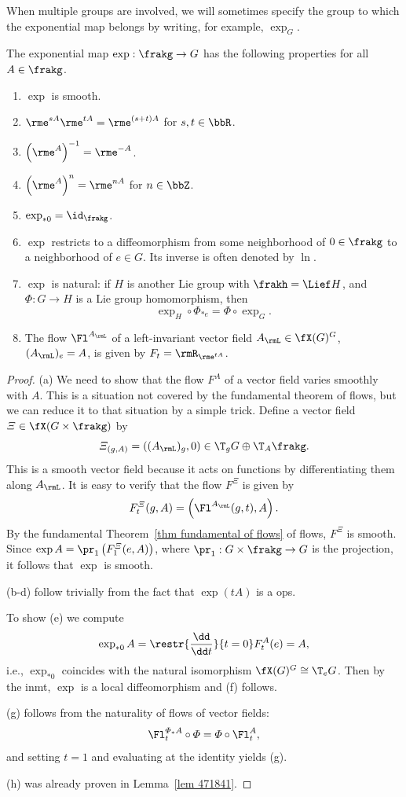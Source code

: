 When multiple groups are involved, we will sometimes specify the group to which the exponential map belongs by writing, for example, $\exp_G$.

\begin{prop}\label{prop properties of exp} The exponential map $\exp:\frakg\to G$ has the following properties for all $A\in\frakg$.
\begin{enumerate}[label=(\alph*)]
    \item $\exp$ is smooth.
    \item $\rme^{sA}\rme^{tA}=\rme^{(s+t)A}$ for $s,t\in\bbR$.
    \item $\left(\rme^A\right)^{-1}=\rme^{-A}$.
    \item $\left(\rme^A\right)^{n}=\rme^{nA}$ for $n\in \bbZ$.
    \item $\exp_{\ast 0}=\id_\frakg$.
    \item $\exp$ restricts to a diffeomorphism from some neighborhood of $0\in \frakg$ to a neighborhood of $e\in G$. Its inverse is often denoted by $\ln$.
    \item $\exp$ is natural: if $H$ is another Lie group with $\frakh=\Lief H$, and $\varPhi:G\to H$ is a Lie group homomorphism, then 
    \[\exp_H\circ\varPhi_{\ast e}=\varPhi\circ \exp_G.\]
    \item The flow $\Fl^{A_\rmL}$ of a left-invariant vector field $A_\rmL\in \fX(G)^G$, $(A_\rmL)_e=A$, is given by $F_t=\rmR_{\rme^{tA}}$.
\end{enumerate}
\end{prop}
\begin{proof}
    (a) We need to show that the flow $F^A$ of a vector field varies smoothly with $A$. This is a situation not covered by the fundamental theorem of flows, but we can reduce it to that situation by a simple trick. Define a vector field $\varXi\in\fX(G\times\frakg)$ by
    \[\varXi_{(g,A)}=((A_\rmL)_g,0)\in \T_gG\oplus \T_A \frakg.\]
    This is a smooth vector field because it acts on functions by differentiating them along $A_\rmL$. It is easy to verify that the flow $F^\varXi$ is given by
    \[F^\varXi_t(g,A)=\left(\Fl^{A_\rmL}(g,t),A\right).\]
    By the fundamental Theorem~\ref{thm fundamental of flows} of flows, $F^\varXi$ is smooth. Since $\exp A=\pr_1\left(F^\varXi_1(e,A)\right)$, where $\pr_1:G\times\frakg\to G$ is the projection, it follows that $\exp$ is smooth.

    (b-d) follow trivially from the fact that $\exp(tA)$ is a \gls{ops}.
    
    To show (e) we compute
    \[\exp_{\ast 0}A=\restr{\frac{\dd}{\dd t}}{t=0}F_t^{A}(e)=A,\]
    i.e., $\exp_{\ast 0}$ coincides with the natural isomorphism $\fX(G)^G\cong \T_e G$. Then by the \gls{inmt}, $\exp$ is a local diffeomorphism and (f) follows.

    (g) follows from the naturality of flows of vector fields:
    \[\Fl^{\varPhi_\ast A}_t\circ \varPhi=\varPhi\circ \Fl^{A}_t,\]
    and setting $t=1$ and evaluating at the identity yields (g).

    (h) was already proven in Lemma~\ref{lem 471841}.
\end{proof}

